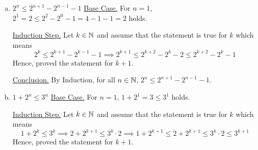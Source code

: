 \begin{enumerate}[(a).]
\begin{proof}
			Thus, for the sequence above we can show that,
			\begin{align*}
				&\frac{1}{2^{k+1}+1} + \frac{1}{2^{k+1}+2} + \ldots + \frac{1}{2^{k+2}-1} + \frac{1}{2^{k+2}} \\
				&\geq \frac{1}{2^{k+1}+2} + \frac{1}{2^{k+1}+2} + \ldots + \frac{1}{2^{k+1}} + \frac{1}{2^{k+2}} \\
				&= \frac{2}{2^{k+1}+2} + \frac{2}{2^{k+1}+4} + \ldots + \frac{2}{2^{k+2}} \\
				&= \frac{1}{2^k + 1} + \frac{1}{2^k + 2} + \ldots + \frac{1}{2^{k+1}} \\
				&\geq \frac{1}{2}
			\end{align*}

			Hence, proved the statement for $k+1$.

			\underline{Conclusion.} By Induction, for all $n \in \mb{N}$,
			$$\frac{1}{2^n+1} + \frac{1}{2^n+2} + \ldots + \frac{1}{2^{n+1}-1} + \frac{1}{2^{n+1}} \geq \frac{1}{2}$$
		\end{proof}

		Now, by Lemma \ref{one},
		$$1 + \frac{k}{2} + \frac{1}{2^k+1} + \frac{1}{2^k+2} + \ldots + \frac{1}{2^{k+1}-1} + \frac{1}{2^{k+1}} \geq 1 + \frac{k}{2} + \frac{1}{2} = 1 + \frac{k+1}{2}$$

		Hence, proved the statement for $k+1$.
			

		\underline{Conclusion.} By Induction, for all $n \in \mb{N}$,
		$$1 + \frac{n}{2} \leq \frac{1}{1} + \frac{1}{2} + \ldots + \frac{1}{2^n-1} + \frac{1}{2^n}$$
		\es

	\item $2^n \leq 2^{n+1} - 2^{n-1} - 1$
		\bs
		\underline{Base Case.} For $n = 1$, $2^1 = 2 \leq 2^2 - 2^0 - 1 = 4-1-1 = 2$ holds.

		\underline{Induction Step.} Let $k \in \mathbb{N}$ and assume that the statement is true for $k$ which means
		$$2^k \leq 2^{k+1}-2^{k-1}-1 \implies 2^{k+1} \leq 2^{k+2}-2^k-2 \leq 2^{k+2}-2^k-1$$
		Hence, proved the statement for $k+1$.
		
		\underline{Conclusion.} By Induction, for all $n \in \mb{N}$, $2^n \leq 2^{n+1} - 2^{n-1} - 1$.
		\es

	\item $1 + 2^n \leq 3^n$
		\bs
		\underline{Base Case.} For $n = 1$, $1 + 2^1 = 3 \leq 3^1$ holds.

		\underline{Induction Step.} Let $k \in \mathbb{N}$ and assume that the statement is true for $k$ which means
		$$
		1 + 2^k \leq 3^k \implies 2 + 2^{k+1} \leq 3^k \cdot 2 
		\implies 1 + 2^{k+1} \leq 2 + 2^{k+1} \leq 3^k \cdot 2 \leq 3^{k+1}
		$$
		Hence, proved the statement for $k+1$.


\end{enumerate}
